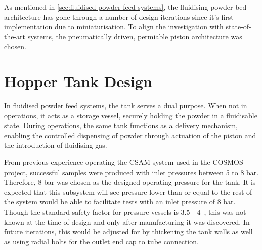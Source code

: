As mentioned in \autoref{sec:fluidised-powder-feed-systems}, the fluidising powder bed architecture has gone through a number of design iterations since it's first implementation due to miniaturisation. To align the investigation with state-of-the-art systems, the pneumatically driven, permiable piston architecture was chosen. 

\section{Hopper Tank Design}
In fluidised powder feed systems, the tank serves a dual purpose. When not in operations, it acts as a storage vessel, securely holding the powder in a fluidisable state. During operations, the same tank functions as a delivery mechanism, enabling the controlled dispensing of powder through actuation of the piston and the introduction of fluidising gas. 

From previous experience operating the CSAM system used in the COSMOS project, successful samples were produced with inlet pressures between 5 to 8 bar. Therefore, 8 bar was chosen as the designed operating pressure for the tank. It is expected that this subsystem will see pressure lower than or equal to the rest of the system would be able to facilitate tests with an inlet pressure of 8 bar. Though the standard safety factor for pressure vessels is 3.5 - 4~\cite{redriver2024asme}, this was not known at the time of design and only after manufacturing it was discovered. In future iterations, this would be adjusted for by thickening the tank walls as well as using radial bolts for the outlet end cap to tube connection.

